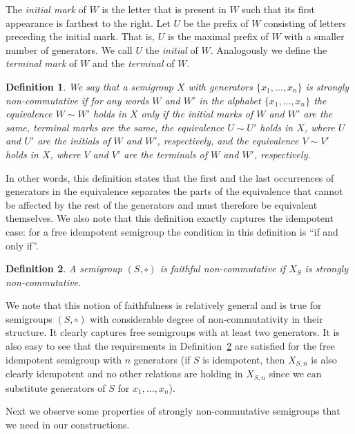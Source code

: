 \documentclass[11pt,letterpaper]{article}
\newtheorem{definition}{Definition}
\begin{document}
The \emph{initial mark} of $W$ is the letter that is present in $W$ such that
its first appearance is farthest to the right. Let $U$ be the prefix of $W$
consisting of letters preceding the initial mark. That is, $U$ is the maximal
prefix of $W$ with a smaller number of generators. We call $U$ the
\emph{initial} of $W$. Analogously we define the \emph{terminal mark} of $W$ and
the \emph{terminal} of $W$.

\begin{definition}\label{def:strong_non_commutativity}
We say that a semigroup $X$ with generators $\{x_1,\ldots, x_n\}$ is
\emph{strongly non-commutative} if for any words $W$ and $W'$ in the
alphabet $\{x_1,\ldots, x_n\}$ the equivalence $W\sim W'$ holds in $X$ only if
the initial marks of $W$ and $W'$ are the same, terminal marks are the same,
the equivalence $U \sim U'$ holds in $X$, where $U$ and $U'$ are the initials of
$W$ and $W'$, respectively, and the equivalence $V \sim V'$ holds in $X$, where
$V$ and $V'$ are the terminals of $W$ and $W'$, respectively.
\end{definition}

In other words, this definition states that the first and the last occurrences
of generators in the equivalence separates the parts of the equivalence that
cannot be affected by the rest of the generators and must therefore be equivalent themselves. We also note that this definition exactly captures the
idempotent case: for a free idempotent semigroup the condition in this
definition is ``if and only if''\cite{GreenR52}.

\begin{definition} \label{def:faithful}
A semigroup $(S, \circ)$ is \emph{faithful non-commutative} if $X_S$ is strongly non-commutative.
\end{definition}

We note that this notion of faithfulness is relatively general and is true for
semigroups $(S,\circ)$ with considerable degree of non-commutativity in their
structure. It clearly captures free semigroups with at least two generators. It is also easy to see that the
requirements in Definition~\ref{def:faithful} are satisfied for the free
idempotent semigroup with $n$ generators (if $S$ is idempotent, then $X_{S,n}$ is also
clearly idempotent and no other relations are holding in $X_{S,n}$ since we can
substitute generators of $S$ for $x_1, \ldots, x_n$).

Next we observe some properties of strongly non-commutative semigroups that we
need in our constructions.
\end{document}
